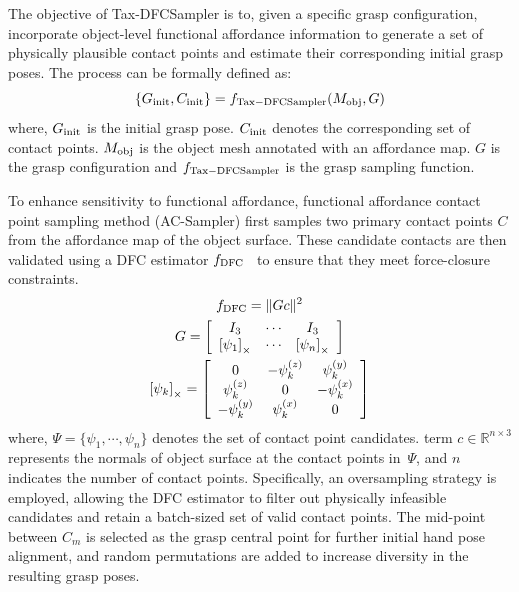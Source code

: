 The objective of Tax-DFCSampler is to, given a specific grasp configuration, incorporate object-level functional affordance information to generate a set of physically plausible contact points and estimate their corresponding initial grasp poses. The process can be formally defined as:
\begin{equation}
    \{G_{\rm init}, C_{\rm init}\} = f_{\rm Tax-DFCSampler}(M_{\rm obj}, G)
\end{equation}
where, $G_{\rm init}$ is the initial grasp pose. $C_{\rm init}$ denotes the corresponding set of contact points. $M_{\rm obj}$ is the object mesh annotated with an affordance map. $G$ is the grasp configuration and $f_{\rm Tax-DFCSampler}$ is the grasp sampling function.

To enhance sensitivity to functional affordance, functional affordance contact point sampling method (AC-Sampler) first samples two primary contact points $C$  from the affordance map of the object surface. These candidate contacts are then validated using a DFC estimator $f_{\rm DFC}$~\cite{liu2021synthesizing} to ensure that they meet force-closure constraints. 
\begin{equation}
\begin{gathered}
f_{\rm DFC}=\|G c\|^2 \\
G=\left[\begin{array}{ccc}
I_3 & \cdots & I_3 \\
{\left[\psi_1\right]_{\times}} & \cdots & {\left[\psi_n\right]_{\times}}
\end{array}\right] \\
{\left[\psi_k\right]_{\times}=\left[\begin{array}{ccc}
0 & -\psi_k^{(z)} & \psi_k^{(y)} \\
\psi_k^{(z)} & 0 & -\psi_k^{(x)} \\
-\psi_k^{(y)} & \psi_k^{(x)} & 0
\end{array}\right]}
\end{gathered}
\end{equation}
where, $\Psi=\{\psi_1, \cdots,\psi_n\}$ denotes the set of contact point candidates. term $c \in \mathbb{R}^{n \times 3}$ represents the normals of object surface at the contact points in~$\Psi$, and $n$ indicates the number of contact points. 
Specifically, an oversampling strategy is employed, allowing the DFC estimator to filter out physically infeasible candidates and retain a batch-sized set of valid contact points. The mid-point between $C_m$ is selected as the grasp central point for further initial hand pose alignment, and random permutations are added to increase diversity in the resulting grasp poses.


